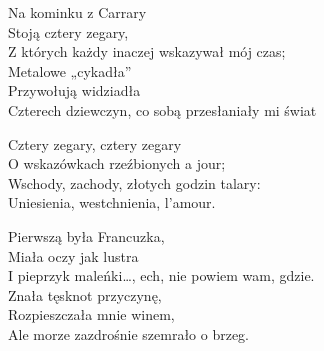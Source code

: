 \begin{text}
    Na kominku z Carrary\\
    Stoją cztery zegary,\\
    Z których każdy inaczej wskazywał mój czas;\\
    Metalowe „cykadła”\\
    Przywołują widziadła\\
    Czterech dziewczyn, co sobą przesłaniały mi świat

    Cztery zegary, cztery zegary\\
    O wskazówkach rzeźbionych a jour;\\
    Wschody, zachody, złotych godzin talary:\\
    Uniesienia, westchnienia, l’amour.

    Pierwszą była Francuzka,\\
    Miała oczy jak lustra\\
    I pieprzyk maleńki…, ech, nie powiem wam, gdzie.\\
    Znała tęsknot przyczynę,\\
    Rozpieszczała mnie winem,\\
    Ale morze zazdrośnie szemrało o brzeg.
\end{text}
\begin{chord}

\end{chord}